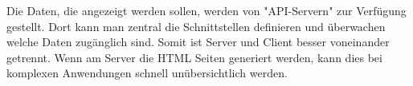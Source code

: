 Die Daten, die angezeigt werden sollen, werden von "API-Servern" zur Verfügung gestellt. Dort kann man zentral die Schnittstellen definieren und überwachen welche Daten zugänglich sind. Somit ist Server und Client besser voneinander getrennt. Wenn am Server die HTML Seiten generiert werden, kann dies bei komplexen Anwendungen schnell unübersichtlich werden.

